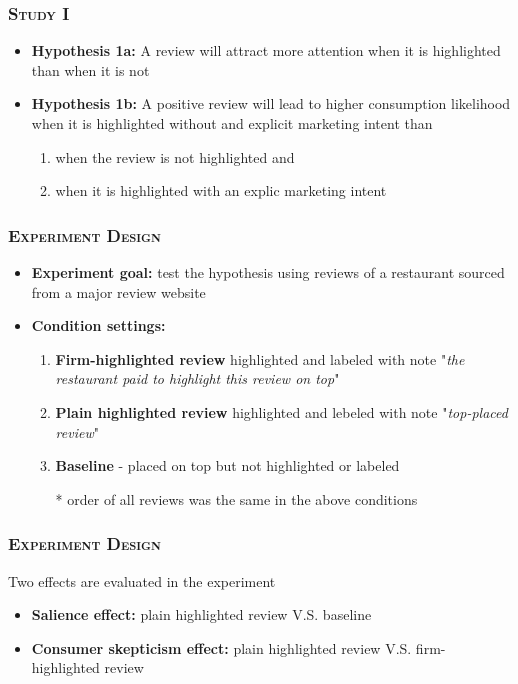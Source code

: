 \documentclass{../presentation}
\begin{document}
    \begin{frame}
        \frametitle{\textsc{Study I}}

        \begin{itemize}
            \item \textrm{\bfseries Hypothesis 1a:} A review will attract more attention when it is highlighted than when it is not
            \item \textrm{\bfseries Hypothesis 1b:} A positive review will lead to higher consumption likelihood when it is highlighted without and explicit marketing intent than
            \begin{enumerate}
                \item when the review is not highlighted and
                \item when it is highlighted with an explic  marketing intent
            \end{enumerate}
        \end{itemize}

    \end{frame}

    \begin{frame}
        \frametitle{\textsc{Experiment Design}}

        \begin{itemize}
            \item \textbf{Experiment goal: } test the hypothesis using reviews of a restaurant sourced from a major review website
            \item \textbf{Condition settings:}
            \begin{enumerate}
                \item \textbf{Firm-highlighted review} highlighted and labeled with note "\textit{the restaurant paid to highlight this review on top}"
                \item \textbf{Plain highlighted review} highlighted and lebeled with note "\textit{top-placed review}"
                \item \textbf{Baseline} - placed on top but not highlighted or labeled
                \item[*] order of all reviews was the same in the above conditions
            \end{enumerate}
        \end{itemize}

    \end{frame}

    \begin{frame}
        \frametitle{\textsc{Experiment Design}}

        Two effects are evaluated in the experiment

        \begin{itemize}
            \small
            \item \textbf{Salience effect: } plain highlighted review V.S. baseline
            \item \textbf{Consumer skepticism effect: } plain highlighted review V.S. firm-highlighted review
        \end{itemize}

    \end{frame}
\end{document}
